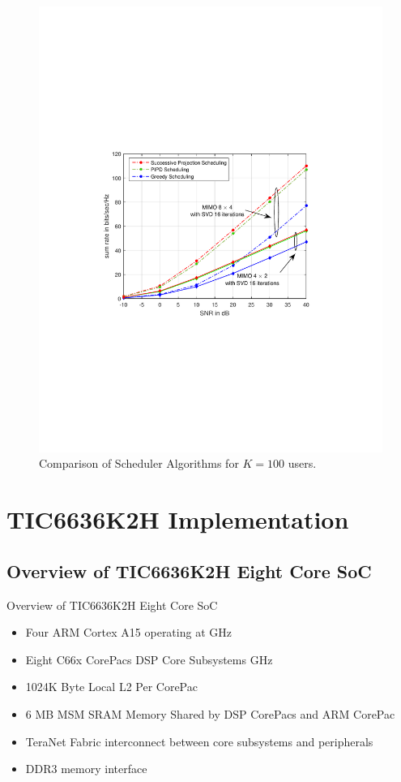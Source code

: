 \documentclass[11pt]{beamer}
\begin{document}
\begin{frame}
\begin{figure}
	\centering
	\caption{Comparison of Scheduler Algorithms for $K = 100$ users.}
	\includegraphics[trim=1.5in 3.5in 1.5in 3.5in,width=0.8\columnwidth]{sra_100}
\end{figure}
\end{frame}

\section{TIC6636K2H Implementation}

\subsection{Overview of TIC6636K2H Eight Core SoC}

\begin{frame}{Overview of TIC6636K2H Eight Core SoC}
	\begin{itemize}
		\item Four ARM Cortex A15 operating at \@ {}GHz
		\item Eight C66x CorePacs DSP Core Subsystems \@ {}GHz
		\item 1024K Byte Local L2 Per CorePac
		\item 6 MB MSM SRAM Memory Shared by DSP CorePacs and ARM CorePac
		\item TeraNet Fabric interconnect between core subsystems and peripherals
		\item DDR3 memory interface
	\end{itemize}
\end{frame}
\end{document}
